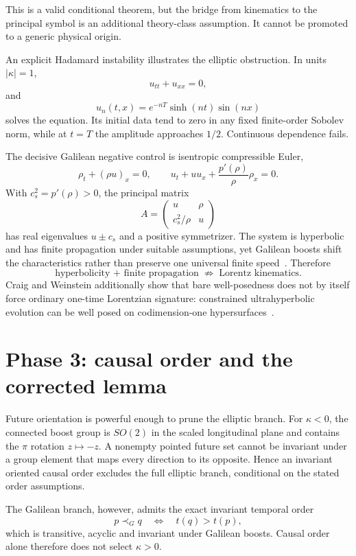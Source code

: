 \documentclass[11pt,a4paper]{article}
\newcommand{\kap}{\kappa}
\begin{document}
This is a valid conditional theorem, but the bridge from kinematics to the principal symbol is an additional theory-class assumption.  It cannot be promoted to a generic physical origin.

An explicit Hadamard instability illustrates the elliptic obstruction.  In units $|\kap|=1$,
\[
u_{tt}+u_{xx}=0,
\]
and
\[
u_n(t,x)=e^{-nT}\sinh(nt)\sin(nx)
\]
solves the equation.  Its initial data tend to zero in any fixed finite-order Sobolev norm, while at $t=T$ the amplitude approaches $1/2$.  Continuous dependence fails.

The decisive Galilean negative control is isentropic compressible Euler,
\[
\rho_t+(\rho u)_x=0,
\qquad
u_t+uu_x+\frac{p'(\rho)}{\rho}\rho_x=0.
\]
With $c_s^2=p'(\rho)>0$, the principal matrix
\[
A=\begin{pmatrix}u&\rho\\c_s^2/\rho&u\end{pmatrix}
\]
has real eigenvalues $u\pm c_s$ and a positive symmetrizer.  The system is hyperbolic and has finite propagation under suitable assumptions, yet Galilean boosts shift the characteristics rather than preserve one universal finite speed~\cite{wiedemann2017}.  Therefore
\[
\boxed{\text{hyperbolicity + finite propagation}\;\not\Rightarrow\;\text{Lorentz kinematics}.}
\]
Craig and Weinstein additionally show that bare well-posedness does not by itself force ordinary one-time Lorentzian signature: constrained ultrahyperbolic evolution can be well posed on codimension-one hypersurfaces~\cite{craig2009}.

\section{Phase 3: causal order and the corrected lemma}
Future orientation is powerful enough to prune the elliptic branch.  For $\kap<0$, the connected boost group is $SO(2)$ in the scaled longitudinal plane and contains the $\pi$ rotation $z\mapsto-z$.  A nonempty pointed future set cannot be invariant under a group element that maps every direction to its opposite.  Hence an invariant oriented causal order excludes the full elliptic branch, conditional on the stated order assumptions.

The Galilean branch, however, admits the exact invariant temporal order
\begin{equation}
p\prec_G q\quad\Longleftrightarrow\quad t(q)>t(p),
\end{equation}
which is transitive, acyclic and invariant under Galilean boosts.  Causal order alone therefore does not select $\kap>0$.
\end{document}
